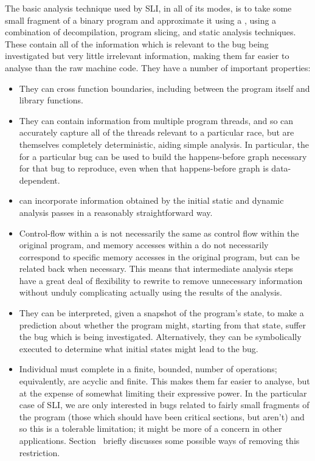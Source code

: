 The basic analysis technique used by SLI, in all of its modes, is to
take some small fragment of a binary program and approximate it using
a \StateMachine{},
using a combination of decompilation, program slicing, and static
analysis techniques.  These \StateMachines contain all of the
information which is relevant to the bug being investigated but very
little irrelevant information, making them far easier to analyse than
the raw machine code.  They have a number of important properties:

\begin{itemize}
\item
  They can cross function boundaries, including between the program
  itself and library functions.
\item
  They can contain information from multiple program threads, and so
  can accurately capture all of the threads relevant to a particular
  race, but are themselves completely deterministic, aiding simple
  analysis.  In particular, the \StateMachine for a particular bug can
  be used to build the happens-before graph necessary for that bug to
  reproduce, even when that happens-before graph is data-dependent.
\item
  \STateMachines can incorporate information obtained by the initial
  static and dynamic analysis passes in a reasonably straightforward
  way.
\item
  Control-flow within a \StateMachine is not necessarily the same as
  control flow within the original program, and memory accesses within
  a \StateMachine do not necessarily correspond to specific memory
  accesses in the original program, but can be related back when
  necessary.  This means that intermediate analysis steps have a great
  deal of flexibility to rewrite \StateMachines to remove unnecessary
  information without unduly complicating actually using the results
  of the analysis.
\item
  They can be interpreted, given a snapshot of the program's state, to
  make a prediction about whether the program might, starting from
  that state, suffer the bug which is being investigated.
  Alternatively, they can be symbolically executed to determine what
  initial states might lead to the bug.
\item
  Individual \StateMachines must complete in a finite, bounded, number
  of operations; equivalently, \StateMachines are acyclic and finite.
  This makes them far easier to analyse, but at the expense of
  somewhat limiting their expressive power.  In the particular case of
  SLI, we are only interested in bugs related to fairly small
  fragments of the program (those which should have been critical
  sections, but aren't) and so this is a tolerable limitation; it
  might be more of a concern in other applications.
  Section~ briefly discusses some possible ways of removing
  this restriction.
\end{itemize}

